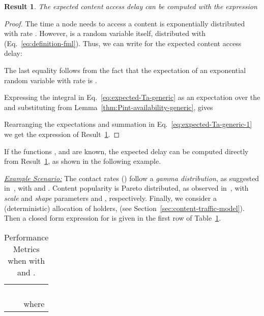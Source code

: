 \documentclass[journal]{IEEEtran}
\newtheorem{result}{Result}
\newcommand{\eq}[1]{Eq.~\eqref{#1}}
\begin{document}
\begin{result}\label{result:ETm}
The expected content access delay can be computed with the expression

\end{result}
\begin{proof}
The time  a node  needs to access a content  is exponentially distributed with rate . However,  is a random variable itself, distributed with  (\eq{eq:definition-fml}). Thus, we can write for the expected content access delay:

\begin{footnotesize}

\end{footnotesize}
The last equality follows from the fact that the expectation of an exponential random variable with rate  is . 


Expressing the integral in \eq{eq:expected-Ta-generic} as an expectation over the  and substituting  from Lemma~\ref{thm:Pint-availability-generic}, gives

Rearranging the expectations and summation in \eq{eq:expected-Ta-generic-1} we get the expression of Result~\ref{result:ETm}.
\end{proof}

If the functions ,  and  are known, the expected delay  can be computed directly from Result~\ref{result:ETm}, as shown in the following example. 

\textit{\underline{Example Scenario:}} The contact rates () follow a \textit{gamma distribution}, as suggested in~\cite{Passarella-aggregateIT}, with  and .  Content popularity  is Pareto distributed, as observed in~\cite{youtube-traffic-from-edge, RSS-traffic-characteristics, pavlos-dataset-AOC}, with \textit{scale} and \textit{shape} parameters  and , respectively. Finally, we consider a (deterministic) allocation of holders,  (see Section~\ref{sec:content-traffic-model}). Then a closed form expression for  is given in the first row of Table~\ref{table:expressions-case-study}.

\begin{table}[!h]
\centering
\caption{Performance Metrics when  with  and .}
\small
\begin{tabular}{|l|l|}
\hline
{}&{}\\
\hspace{-0.02\linewidth}
 &
\hspace{-0.02\linewidth}
\\
{}&{}\\
\hline
\hspace{-0.02\linewidth}
 \hspace{-0.02\linewidth} &
\hspace{-0.02\linewidth}
  \\
{}&
\multicolumn{1}{r|}{
\hspace{-0.02\linewidth}
where 
}\\
\hline
\end{tabular}
\normalsize
\label{table:expressions-case-study}
\end{table}
\end{document}
